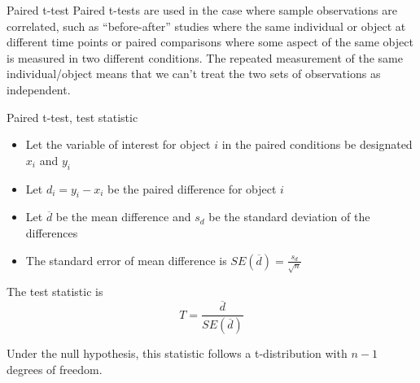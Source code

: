\documentclass[presentation]{beamer}
\begin{document}
\begin{frame}[label={sec:org0d363c2}]{Paired t-test}
Paired t-tests are used in the case where sample observations are correlated, such as ``before-after'' studies where the same individual or object at different time points or paired comparisons where some aspect of the same object is measured in two different conditions. The repeated measurement of the same individual/object means that we can't treat the two sets of observations as independent.
\end{frame}

\begin{frame}[label={sec:orgac5d08c}]{Paired t-test, test statistic}
\begin{itemize}
\item Let the variable of interest for object \(i\) in the paired conditions be designated \(x_i\) and \(y_i\)
\item Let \(d_i = y_i − x_i\) be the paired difference for object \(i\)
\item Let \(\overline{d}\) be the mean difference and \(s_d\) be the standard deviation of the differences
\item The standard error of mean difference is  \(SE(\overline{d}) = \frac{s_d}{\sqrt{n}}\)
\end{itemize}

The test statistic is 
\[
T = \frac{\overline{d}}{SE(\overline{d})}
\] 

Under the null hypothesis, this statistic follows a t-distribution with \(n − 1\) degrees of freedom.
\end{frame}
\end{document}
